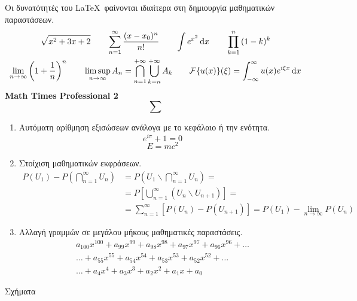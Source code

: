 \documentclass[a4paper,11pt]{article}
\def\xroma#1{\textcolor{red!70!black}{#1}}
\theoremstyle{definition}
\begin{document}
\begin{center}
{\textbf{\Smallcaps{\xroma{Μαθηματικες Παραστασεις}}}}
\end{center}
Οι δυνατότητές του \LaTeX\  φαίνονται ιδιαίτερα στη δημιουργία μαθηματικών παραστάσεων. 
\begin{gather*}
\sqrt{x^2+3x+2}\qquad \sum_{n=1}^{\infty}{\frac{(x-x_0)^n}{n!}}\qquad \int{e^{x^2}}\mathop{\kern0pt\mathrm{d}}\!{} x\qquad \prod_{k=1}^{n}{(1-k)^k }\\
\lim_{n\to\infty}{\left(1+\frac{1}{n}\right)^n}\qquad \limsup_{n\to\infty}{A_n}=\bigcap_{n=1}^{+\infty}{\bigcup_{k=n}^{+\infty}{A_k}}\qquad \mathcal{F}\{u(x)\}(\xi)=\int_{-\infty}^{\infty}{u(x)e^{i\xi x}\mathop{\kern0pt\mathrm{d}}\!{} x}
\end{gather*}
\textbf{Math Times Professional 2} 
\[ \sum \]
\begin{enumerate}
\item Αυτόματη αρίθμηση εξισώσεων ανάλογα με το κεφάλαιο ή την ενότητα.
\begin{equation}\label{euler}
e^{i\pi}+1=0
\end{equation}
\begin{equation}\label{ein}
E=mc^2
\end{equation}
\item Στοίχιση μαθηματικών εκφράσεων. 
\begin{align*}
P(U_1)-P\left(\bigcap_{n=1}^{\infty}{U_n} \right) &=P\left( U_1\backslash \bigcap_{n=1}^{\infty}{U_n}\right)=\\
&=P\left[\bigcup_{n=1}^{\infty}{\left( U_n\backslash U_{n+1}\right) }\right]=\\
&=\sum_{n=1}^{\infty}{\left[P(U_n)-P(U_{n+1}) \right] }=P(U_1)-\lim_{n\to\infty}{P(U_{n})}
\end{align*}
\item Αλλαγή γραμμών σε μεγάλου μήκους μαθηματικές παραστάσεις.
\begin{multline*}
a_{100}x^{100}+a_{99}x^{99}+a_{98}x^{98}+a_{97}x^{97}+a_{96}x^{96}+\ldots\\\ldots +a_{55}x^{55}+a_{54}x^{54}+a_{53}x^{53}+a_{52}x^{52}+\ldots\\\ldots+a_{4}x^{4}+a_{3}x^{3}+a_{2}x^{2}+a_{1}x+a_{0}
\end{multline*}
\end{enumerate}
\newpage
\begin{center}
{\Large Σχήματα}
\end{center}
\end{document}
